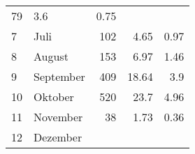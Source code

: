 \begin{longtable}{lXrrr}
       \num{79} &
       \num[round-mode=places,round-precision=2]{3.6} &
         \num[round-mode=places,round-precision=2]{0.75} \\

     7 &
     \multicolumn{1}{X}{ Juli   } &


       \num{102} &
       \num[round-mode=places,round-precision=2]{4.65} &
         \num[round-mode=places,round-precision=2]{0.97} \\

     8 &
     \multicolumn{1}{X}{ August   } &


       \num{153} &
       \num[round-mode=places,round-precision=2]{6.97} &
         \num[round-mode=places,round-precision=2]{1.46} \\

     9 &
     \multicolumn{1}{X}{ September   } &


       \num{409} &
       \num[round-mode=places,round-precision=2]{18.64} &
         \num[round-mode=places,round-precision=2]{3.9} \\

     10 &
     \multicolumn{1}{X}{ Oktober   } &


       \num{520} &
       \num[round-mode=places,round-precision=2]{23.7} &
         \num[round-mode=places,round-precision=2]{4.96} \\

     11 &
     \multicolumn{1}{X}{ November   } &


       \num{38} &
       \num[round-mode=places,round-precision=2]{1.73} &
         \num[round-mode=places,round-precision=2]{0.36} \\

     12 &
     \multicolumn{1}{X}{ Dezember   } &



\end{longtable}
